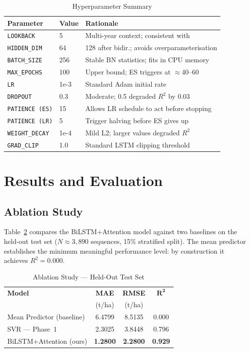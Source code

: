 \documentclass[conference]{IEEEtran}
\begin{document}
\begin{table}[H]
\caption{Hyperparameter Summary}
\label{tab:hyper}
\centering
\begin{tabular}{lll}
\toprule
\textbf{Parameter} & \textbf{Value} & \textbf{Rationale} \\
\midrule
\texttt{LOOKBACK}       & 5     & Multi-year context; consistent with \cite{feng2019} \\
\texttt{HIDDEN\_DIM}    & 64    & 128 after bidir.; avoids overparameterisation \\
\texttt{BATCH\_SIZE}    & 256   & Stable BN statistics; fits in CPU memory \\
\texttt{MAX\_EPOCHS}    & 100   & Upper bound; ES triggers at $\approx$40--60 \\
\texttt{LR}             & 1e-3  & Standard Adam initial rate \\
\texttt{DROPOUT}        & 0.3   & Moderate; 0.5 degraded $R^2$ by 0.03 \\
\texttt{PATIENCE (ES)}  & 15    & Allows LR schedule to act before stopping \\
\texttt{PATIENCE (LR)}  & 5     & Trigger halving before ES gives up \\
\texttt{WEIGHT\_DECAY}  & 1e-4  & Mild L2; larger values degraded $R^2$ \\
\texttt{GRAD\_CLIP}     & 1.0   & Standard LSTM clipping threshold \\
\bottomrule
\end{tabular}
\end{table}

\section{Results and Evaluation}
\label{sec:results}

\subsection{Ablation Study}
\label{sec:ablation}

Table~\ref{tab:ablation} compares the BiLSTM+Attention model against two baselines
on the held-out test set ($N \approx 3{,}890$ sequences, 15\% stratified split).
The mean predictor establishes the minimum meaningful performance level:
by construction it achieves $R^2 = 0.000$.

\begin{table}[H]
\caption{Ablation Study — Held-Out Test Set}
\label{tab:ablation}
\centering
\begin{tabular}{lccc}
\toprule
\textbf{Model} & \textbf{MAE} & \textbf{RMSE} & $\mathbf{R^2}$ \\
               & (t/ha)       & (t/ha)        & \\
\midrule
Mean Predictor (baseline) & 6.4799 & 8.5135 & 0.000 \\
SVR --- Phase~1           & 2.3025 & 3.8448 & 0.796 \\
BiLSTM+Attention (ours)   & \textbf{1.2800} & \textbf{2.2800} & \textbf{0.929} \\
\bottomrule
\end{tabular}
\end{table}
\end{document}
